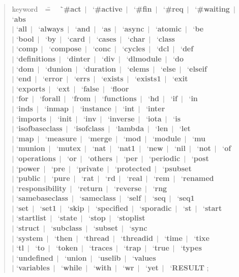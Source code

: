 \documentclass{overturerepchap}
\newcommand{\Rule}[2]{
  \begin{quote}\begin{tabbing}
    #1\index{#1}\ \ \= = \ \ \= #2  ; %

  \end{tabbing}\end{quote}
  }
\newcommand{\RuleTarget}[1]{\hypertarget{rule:#1}{}}
\newcommand{\Ruledef}[2]
{
  \RuleTarget{#1}\Rule{#1}{#2}%
  }
\newcommand{\dsepl}{\ $|$\ }
\newcommand{\dsep}{\\ \> $|$ \>}
\newcommand{\Lop}[1]{`{\bf\ttfamily #1}\Quote}
\begin{document}
{\newcommand{\Lks}[1]{\Lop{#1}\dsepl}
\newcommand{\Lksb}[1]{\Lop{#1}\dsep}
\Ruledef{keyword}{
  \Lks{\#act}
  \Lks{\#active}
  \Lks{\#fin}
  \Lks{\#req}
  \Lks{\#waiting}
  \Lksb{abs}
  \Lks{all}
  \Lks{always}
  \Lks{and}
\Lks{as}
  \Lks{async}
  \Lks{atomic}
  \Lksb{be}
  \Lks{bool}
  \Lks{by}
  \Lks{card}
  \Lks{cases}
  \Lks{char}
  \Lksb{class}
  \Lks{comp}
  \Lks{compose}
  \Lks{conc}
  \Lks{cycles}
  \Lks{dcl}
  \Lksb{def}
  \Lks{definitions}
  \Lks{dinter}
  \Lks{div}
  \Lks{dlmodule}
  \Lksb{do}
  \Lks{dom}
  \Lks{dunion}
  \Lks{duration}
  \Lks{elems}
  \Lks{else}
  \Lksb{elseif}
  \Lks{end}
  \Lks{error}
  \Lks{errs}
  \Lks{exists}
  \Lks{exists1}
  \Lksb{exit}
  \Lks{exports}
  \Lks{ext}
  \Lks{false}
  \Lksb{floor}
  \Lks{for}
  \Lks{forall}
  \Lks{from}
  \Lks{functions}
  \Lks{hd}
  \Lks{if}
  \Lksb{in}
  \Lks{inds}
  \Lks{inmap}
  \Lks{instance}
  \Lks{int}
  \Lksb{inter}
  \Lks{imports}
  \Lks{init}
  \Lks{inv}
  \Lks{inverse}
  \Lks{iota}
  \Lksb{is}
  \Lks{isofbaseclass}
  \Lks{isofclass}
  \Lks{lambda}
  \Lks{len}
  \Lksb{let}
  \Lks{map}
  \Lks{measure}
  \Lks{merge}
  \Lks{mod}
  \Lks{module}
  \Lksb{mu}
  \Lks{munion}
  \Lks{mutex}
  \Lks{nat}
  \Lks{nat1}
  \Lks{new}
  \Lks{nil}
  \Lks{not}
  \Lksb{of}
  \Lks{operations}
  \Lks{or}
  \Lks{others}
  \Lks{per}
  \Lks{periodic}
  \Lksb{post}
  \Lks{power}
  \Lks{pre}
  \Lks{private}
  \Lks{protected}
  \Lksb{psubset}
  \Lks{public}
  \Lks{pure}
  \Lks{rat}
  \Lks{rd}
  \Lks{real}
  \Lks{rem}
  \Lksb{renamed}
  \Lks{responsibility}
  \Lks{return}
  \Lks{reverse}
  \Lksb{rng}
  \Lks{samebaseclass}
  \Lks{sameclass}
  \Lks{self}
  \Lks{seq}
  \Lksb{seq1}
  \Lks{set}
  \Lks{set1}
  \Lks{skip}
  \Lks{specified}
  \Lks{sporadic}
  \Lks{st}
  \Lksb{start}
  \Lks{startlist}
  \Lks{state}
  \Lks{stop}
  \Lksb{stoplist}
  \Lks{struct}
  \Lks{subclass}
  \Lks{subset}
  \Lksb{sync}
  \Lks{system}
  \Lks{then}
  \Lks{thread}
  \Lks{threadid}
  \Lks{time}
  \Lksb{tixe}
  \Lks{tl}
  \Lks{to}
  \Lks{token}
  \Lks{traces}
  \Lks{trap}
  \Lks{true}
  \Lksb{types}
  \Lks{undefined}
  \Lks{union}
  \Lks{uselib}
  \Lksb{values}
  \Lks{variables}
  \Lks{while}
  \Lks{with}
  \Lks{wr}
  \Lks{yet}
  \Lop{RESULT}
  }


}
\end{document}
